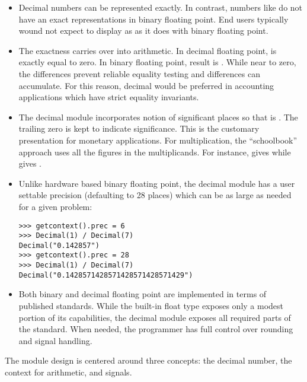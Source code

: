 \begin{itemize}

\item Decimal numbers can be represented exactly.  In contrast, numbers like
 do not have an exact representations in binary floating point.
End users typically wound not expect  to display as
 as it does with binary floating point.

\item The exactness carries over into arithmetic.  In decimal floating point,
 is exactly equal to zero.  In binary floating
point, result is .  While near to zero, the
differences prevent reliable equality testing and differences can accumulate.
For this reason, decimal would be preferred in accounting applications which
have strict equality invariants.

\item The decimal module incorporates notion of significant places so that
 is .  The trailing zero is kept to indicate
significance.  This is the customary presentation for monetary applications. For
multiplication, the ``schoolbook'' approach uses all the figures in the
multiplicands.  For instance,  gives  while
 gives .

\item Unlike hardware based binary floating point, the decimal module has a user
settable precision (defaulting to 28 places) which can be as large as needed for
a given problem:

\begin{verbatim}
>>> getcontext().prec = 6
>>> Decimal(1) / Decimal(7)
Decimal("0.142857")
>>> getcontext().prec = 28
>>> Decimal(1) / Decimal(7)
Decimal("0.1428571428571428571428571429")
\end{verbatim}

\item Both binary and decimal floating point are implemented in terms of published
standards.  While the built-in float type exposes only a modest portion of its
capabilities, the decimal module exposes all required parts of the standard.
When needed, the programmer has full control over rounding and signal handling.

\end{itemize}


The module design is centered around three concepts:  the decimal number, the
context for arithmetic, and signals.

